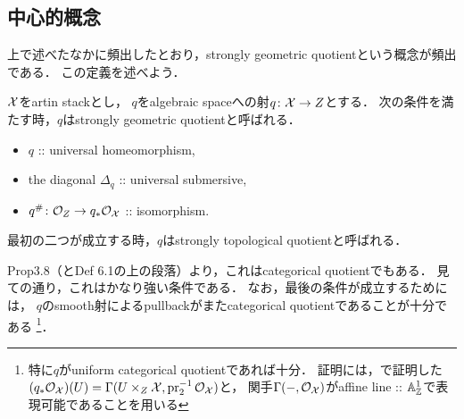 \documentclass[a4paper, dvipdfmx]{jsarticle}
\begin{document}
    \subsection{中心的概念}
    上で述べたなかに頻出したとおり，strongly geometric quotientという概念が頻出である．
    この定義を述べよう．
    \begin{Def}
        $\mathcal{X}$をartin stackとし，
        $q$をalgebraic spaceへの射$q \colon \mathcal{X} \to Z$とする．
        次の条件を満たす時，$q$はstrongly geometric quotientと呼ばれる．
        \begin{itemize}
            \item $q$ :: universal homeomorphism,
            \item the diagonal $\Delta_q$ :: universal submersive,
            \item $q^{\#} \colon \mathcal{O}_{Z} \to q_*\mathcal{O}_{\mathcal{X}}$ :: isomorphism.
        \end{itemize}
        最初の二つが成立する時，$q$はstrongly topological quotientと呼ばれる．
    \end{Def}
    \cite{Rydh13} Prop3.8（とDef 6.1の上の段落）より，これはcategorical quotientでもある．
    見ての通り，これはかなり強い条件である．
    なお，最後の条件が成立するためには，
    $q$のsmooth射によるpullbackがまたcategorical quotientであることが十分である
    \footnote
    {
        特に$q$がuniform categorical quotientであれば十分．
        証明には，\cite{SAAlgSt}で証明した
        $(q_*\mathcal{O}_{\mathcal{X}})(U)=\Gamma(U \times_{Z} \mathcal{X}, \operatorname{pr}_2^{-1}\mathcal{O}_{\mathcal{X}})$と，
        関手$\Gamma(-, \mathcal{O}_{\mathcal{X}})$がaffine line :: $\mathbb{A}_{\mathbb{Z}}^1$で表現可能であることを用いる
    }．



\end{document}
